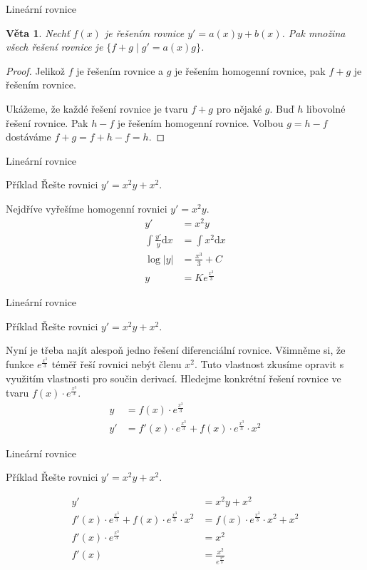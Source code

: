 \documentclass{beamer}
\newtheorem{thm}{Věta}
\theoremstyle{definition}
\theoremstyle{example}
\def\d{\mathrm{d}}
\begin{document}
\begin{frame}{Lineární rovnice}
	\begin{thm}
		Nechť $f(x)$ je řešením rovnice $y' = a(x)y + b(x)$. Pak množina všech řešení rovnice je $\{f + g \mid g' = a(x)g\}$.
	\end{thm}
	\begin{proof}
		Jelikož $f$ je řešením rovnice a $g$ je řešením homogenní rovnice, pak $f + g$ je řešením rovnice.

		Ukážeme, že každé řešení rovnice je tvaru $f + g$ pro nějaké $g$. Buď $h$ libovolné řešení rovnice. Pak $h - f$ je řešením homogenní rovnice. Volbou $g = h - f$ dostáváme $f + g = f + h - f = h$.
	\end{proof}
\end{frame}

\begin{frame}{Lineární rovnice}
	\begin{exampleblock}{Příklad}
		Řešte rovnici $y' = x^2y + x^2$.
	\end{exampleblock}
	Nejdříve vyřešíme homogenní rovnici $y' = x^2y$.
	\begin{align*}
		y' &= x^2y\\
		\int\frac{y'}{y} \d x &= \int x^2 \d x\\
		\log |y| &= \frac{x^3}{3} + C\\
		y &= K e^\frac{x^3}{3}
	\end{align*}
\end{frame}

\begin{frame}{Lineární rovnice}
	\begin{exampleblock}{Příklad}
		Řešte rovnici $y' = x^2y + x^2$.
	\end{exampleblock}
	Nyní je třeba najít alespoň jedno řešení diferenciální rovnice. Všimněme si, že funkce $e^\frac{x^3}{3}$ téměř řeší rovnici nebýt členu $x^2$. Tuto vlastnost zkusíme opravit s využitím vlastnosti pro součin derivací. Hledejme konkrétní řešení rovnice ve tvaru $f(x)\cdot e^\frac{x^3}{3}$.
	\begin{align*}
		y &= f(x)\cdot e^\frac{x^3}{3}\\
		y' &= f'(x)\cdot e^\frac{x^3}{3} + f(x)\cdot e^\frac{x^3}{3} \cdot x^2
	\end{align*}
\end{frame}

\begin{frame}{Lineární rovnice}
	\begin{exampleblock}{Příklad}
		Řešte rovnici $y' = x^2y + x^2$.
	\end{exampleblock}
	\begin{align*}
		y' &= x^2y + x^2\\
		f'(x)\cdot e^\frac{x^3}{3} + f(x)\cdot e^\frac{x^3}{3} \cdot x^2 &= f(x)\cdot e^\frac{x^3}{3} \cdot x^2 + x^2\\
		f'(x)\cdot e^\frac{x^3}{3} &= x^2\\
		f'(x) &=\frac{x^2}{e^\frac{x^3}{3}}
	\end{align*}
\end{frame}
\end{document}
